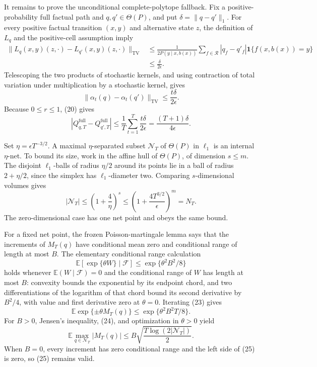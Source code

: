 It remains to prove the unconditional complete-polytope fallback.  Fix a positive-probability full factual path and \(q,q'\in\Theta(P)\), and put \(\delta=\lVert q-q'\rVert_1\).  For every positive factual transition \((x,y)\) and alternative state \(z\), the definition of \(L_q\) and the positive-cell assumption imply
\[
 \begin{aligned}
 \bigl\|L_q(x,y)(z,\cdot)-L_{q'}(x,y)(z,\cdot)\bigr\|_{\mathrm{TV}}
 &\leq\frac1{2P(y\mid x,b(x))}
 \sum_{f\in\mathcal R}|q_f-q'_f|\mathbf 1\{f(x,b(x))=y\}\\
 &\leq\frac{\delta}{2\epsilon}.
 \end{aligned}
 \tag{19}
\]
Telescoping the two products of stochastic kernels, and using contraction of total variation under multiplication by a stochastic kernel, gives
\[
 \lVert\alpha_t(q)-\alpha_t(q')\rVert_{\mathrm{TV}}
 \leq\frac{t\delta}{2\epsilon}.
 \tag{20}
\]
Because \(0\leq r\leq1\), (20) gives
\[
 \left|Q^{\mathrm{full}}_{q,T}-Q^{\mathrm{full}}_{q',T}\right|
 \leq\frac1T\sum_{t=1}^T\frac{t\delta}{2\epsilon}
 =\frac{(T+1)\delta}{4\epsilon}.
 \tag{21}
\]

Set \(\eta=\epsilon T^{-3/2}\).  A maximal \(\eta\)-separated subset \(\mathcal N_T\) of \(\Theta(P)\) in \(\ell_1\) is an internal \(\eta\)-net.  To bound its size, work in the affine hull of \(\Theta(P)\), of dimension \(s\leq m\).  The disjoint \(\ell_1\)-balls of radius \(\eta/2\) around its points lie in a ball of radius \(2+\eta/2\), since the simplex has \(\ell_1\)-diameter two.  Comparing \(s\)-dimensional volumes gives
\[
 |\mathcal N_T|\leq\left(1+\frac4\eta\right)^s
 \leq\left(1+\frac{4T^{3/2}}\epsilon\right)^m=N_T.
 \tag{22}
\]
The zero-dimensional case has one net point and obeys the same bound.

For a fixed net point, the frozen Poisson-martingale lemma says that the increments of \(M_T(q)\) have conditional mean zero and conditional range of length at most \(B\).  The elementary conditional range calculation
\[
 \mathbb E[\exp\{\theta W\}\mid\mathcal F]
 \leq\exp\{\theta^2B^2/8\}
 \tag{23}
\]
holds whenever \(\mathbb E(W\mid\mathcal F)=0\) and the conditional range of \(W\) has length at most \(B\): convexity bounds the exponential by its endpoint chord, and two differentiations of the logarithm of that chord bound its second derivative by \(B^2/4\), with value and first derivative zero at \(\theta=0\).  Iterating (23) gives
\[
 \mathbb E\exp\{\pm\theta M_T(q)\}
 \leq\exp\{\theta^2B^2T/8\}.
 \tag{24}
\]
For \(B>0\), Jensen's inequality, (24), and optimization in \(\theta>0\) yield
\[
 \mathbb E\max_{q\in\mathcal N_T}|M_T(q)|
 \leq B\sqrt{\frac{T\log(2|\mathcal N_T|)}2}.
 \tag{25}
\]
When \(B=0\), every increment has zero conditional range and the left side of (25) is zero, so (25) remains valid.

